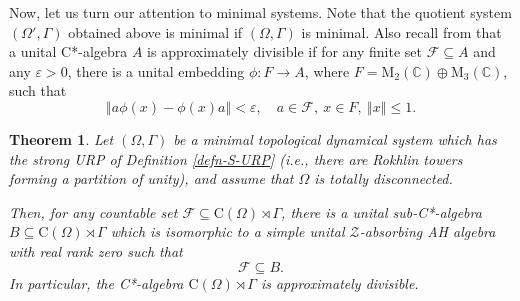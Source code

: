 \documentclass[12pt, oneside, psamsfonts]{amsart}
\newtheorem{thm}{Theorem}[section]
\theoremstyle{definition}
\theoremstyle{remark}
\numberwithin{equation}{section}
\newcommand{\norm}[1]{\left\Vert#1\right\Vert}
\newcommand{\Comp}{\mathbb C}
\newcommand{\eps}{\varepsilon}
\begin{document}
Now, let us turn our attention to minimal systems. Note that the quotient system $(\Omega', \Gamma)$ obtained above is minimal if $(\Omega, \Gamma)$ is minimal. Also recall from \cite{BKR-ADiv} that a unital C*-algebra $A$ is approximately divisible if for any finite set $\mathcal F \subseteq A$ and any $\eps>0$, there is a unital embedding $\phi: F \to A$, where $F=\mathrm{M}_2(\Comp) \oplus \mathrm{M}_3(\Comp)$, such that $$ \norm{a \phi(x) - \phi(x) a} < \eps,\quad a \in \mathcal F,\ x \in F,\ \norm{x} \leq 1.$$

\begin{thm}\label{min-alg}
Let $(\Omega, \Gamma)$ be a minimal topological dynamical system which has the strong URP of Definition \ref{defn-S-URP} (i.e., there are Rokhlin towers forming a partition of unity), and assume that $\Omega$ is totally disconnected. 

Then, for any countable set $\mathcal F \subseteq \mathrm{C}(\Omega) \rtimes \Gamma $, there is a unital %
sub-C*-algebra $B \subseteq \mathrm{C}(\Omega) \rtimes \Gamma$ which is isomorphic to a simple unital $\mathcal Z$-absorbing AH algebra with real rank zero
such that $$\mathcal F \subseteq B.$$               
In particular, the C*-algebra $\mathrm{C}(\Omega) \rtimes \Gamma$ is approximately divisible.
\end{thm}
\end{document}
